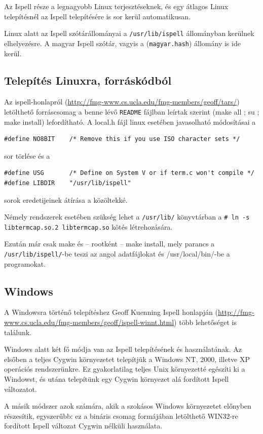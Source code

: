 Az Ispell része a legnagyobb Linux terjesztéseknek,
és egy átlagos Linux telepítésnél az Ispell telepítésére
is sor kerül automatikusan.

Linux alatt az Ispell szótárállományai a \texttt{/usr/lib/ispell}
állományban kerülnek elhelyezésre. A magyar Ispell szótár,
vagyis a (\texttt{magyar.hash}) állomány is ide kerül.

\subsection{Telepítés Linuxra, forráskódból}
Az ispell-honlapról
(\url{http://fmg-www.cs.ucla.edu/fmg-members/geoff/tars/}) letölthető
forráscsomag a benne lévő \texttt{README} fájlban leírtak szerint
(make all ; su ; make install) lefordítható.  A local.h fájl linux
esetében javasolható módosításai a
\begin{verbatim}
#define NO8BIT    /* Remove this if you use ISO character sets */
\end{verbatim}
\noindent sor törlése és a 
\begin{verbatim}
#define USG       /* Define on System V or if term.c won't compile */
#define LIBDIR    "/usr/lib/ispell"
\end{verbatim}
\noindent sorok eredetijeinek átírása a közöltekké.

Némely rendszerek esetében szükség lehet a \texttt{/usr/lib/} könyvtárban a 
\verb+# ln -s libtermcap.so.2 libtermcap.so+ kötés létrehozására.

Ezután már csak make és -- rootként -- make install, mely parancs a
\texttt{/usr/lib/ispell/}-be teszi az angol adatfájlokat és 
/usr/local/bin/-be a programokat.

\subsection{Windows\label{w32-ispell}}

A Windowsra történő telepítéshez Geoff Kuenning Ispell honlapján
(\url{http://fmg-www.cs.ucla.edu/fmg-members/geoff/ispell-winnt.html})
több lehetőséget is találunk.

Windows alatt két fő módja van az Ispell telepítésének
és használatának. Az elsőben a teljes Cygwin környezetet
telepítjük a Windows NT, 2000, illetve XP operációs rendszerünkre.
Ez gyakorlatilag teljes Unix környezetté egészíti ki
a Windowst, és utána telepítünk egy Cygwin környezet alá
fordított Ispell változatot.

A másik módszer azok számára, akik a szokásos Windows környezetet
előnyben részesítik, egyszerűbb: ez a bináris csomag formájában
letölthető WIN32-re fordított Ispell változat Cygwin nélküli
használata.

